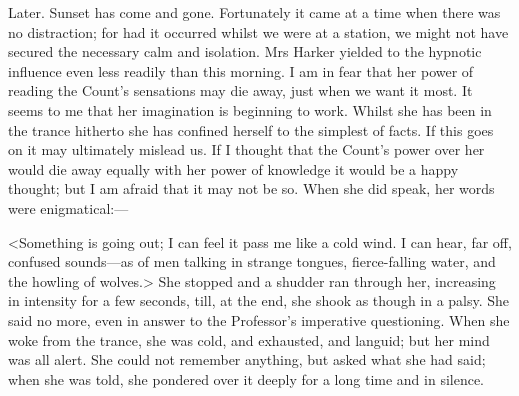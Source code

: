 \begin{diary}{Later.}
Sunset has come and gone. Fortunately it came at a time when there was no distraction; for had it occurred whilst we were at a station, we might not have secured the necessary calm and isolation. Mrs Harker yielded to the hypnotic influence even less readily than this morning. I am in fear that her power of reading the Count's sensations may die away, just when we want it most. It seems to me that her imagination is beginning to work. Whilst she has been in the trance hitherto she has confined herself to the simplest of facts. If this goes on it may ultimately mislead us. If I thought that the Count's power over her would die away equally with her power of knowledge it would be a happy thought; but I am afraid that it may not be so. When she did speak, her words were enigmatical:—

<Something is going out; I can feel it pass me like a cold wind. I can hear, far off, confused sounds—as of men talking in strange tongues, fierce-falling water, and the howling of wolves.> She stopped and a shudder ran through her, increasing in intensity for a few seconds, till, at the end, she shook as though in a palsy. She said no more, even in answer to the Professor's imperative questioning. When she woke from the trance, she was cold, and exhausted, and languid; but her mind was all alert. She could not remember anything, but asked what she had said; when she was told, she pondered over it deeply for a long time and in silence.

 \end{diary}

